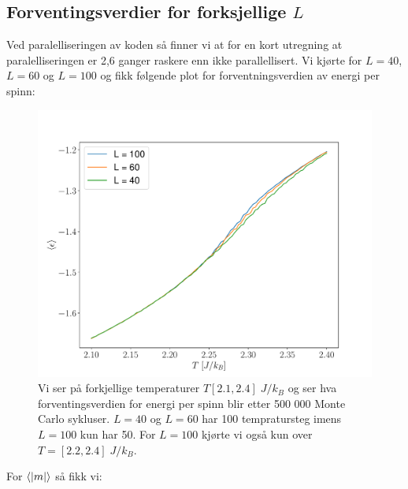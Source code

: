 \documentclass[reprint,english,notitlepage]{revtex4-2}  %
\begin{document}
\subsection*{Forventingsverdier for forksjellige $L$}

Ved paralelliseringen av koden så finner vi at for en kort utregning at paralelliseringen er 2,6 ganger raskere enn ikke parallellisert. Vi kjørte for $L = 40$, $L = 60$ og $L = 100$ og fikk følgende plot for forventningsverdien av energi per spinn:

\begin{figure}[H]
\centering
\includegraphics[scale=0.4, trim=2.5cm 0 0 0 ]{../Images/epsPerTAll.pdf}
\caption{Vi ser på forkjellige temperaturer $T [2.1, 2.4] \; J/k_B$ og ser hva forventingsverdien for energi per spinn blir etter 500 000 Monte Carlo sykluser. $L = 40$ og $L = 60$ har 100 tempratursteg imens $L = 100$ kun har 50. For $L = 100$ kjørte vi også kun over $ T = [2.2, 2.4] \; J/k_B$.}
\label{Fig:epsAll}
\end{figure}

For $\expval{|m|}$ så fikk vi:
\end{document}
